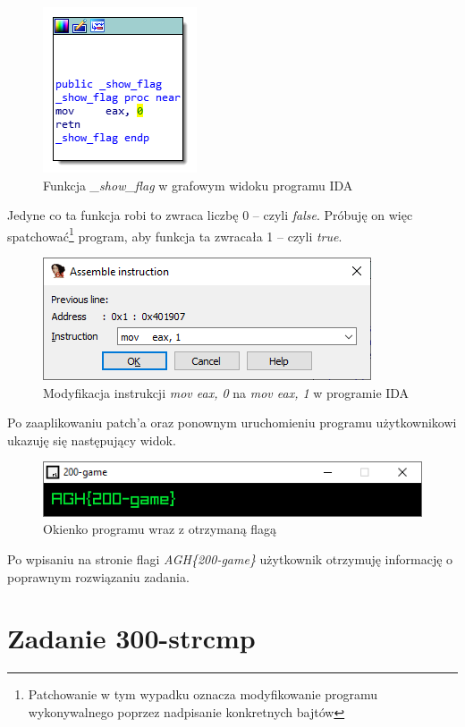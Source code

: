\documentclass[language=polish,type=eng]{aghmodern}
\begin{document}
\begin{appendices}
\begin{figure}[H]
\centering
\includegraphics{200_ida_show_flag}
\caption{Funkcja \emph{\_show\_flag} w grafowym widoku programu IDA}
\end{figure}

Jedyne co ta funkcja robi to zwraca liczbę 0 -- czyli \emph{false}.
Próbuję on więc spatchować\footnote{Patchowanie w tym wypadku oznacza modyfikowanie programu
wykonywalnego poprzez nadpisanie konkretnych bajtów}
program, aby funkcja ta zwracała 1 -- czyli \emph{true}.

\begin{figure}[H]
\centering
\includegraphics{200_ida_patch}
\caption{Modyfikacja instrukcji \emph{mov eax, 0} na \emph{mov eax, 1} w programie IDA}
\end{figure}

Po zaaplikowaniu patch'a oraz ponownym uruchomieniu programu użytkownikowi ukazuję się
następujący widok.

\begin{figure}[H]
\centering
\includegraphics{200_flag}
\caption{Okienko programu wraz z otrzymaną flagą}
\end{figure}

Po wpisaniu na stronie flagi \emph{AGH\{200-game\}} użytkownik otrzymuję informację
o poprawnym rozwiązaniu zadania.

\section{Zadanie 300-strcmp}


\end{appendices}
\end{document}
